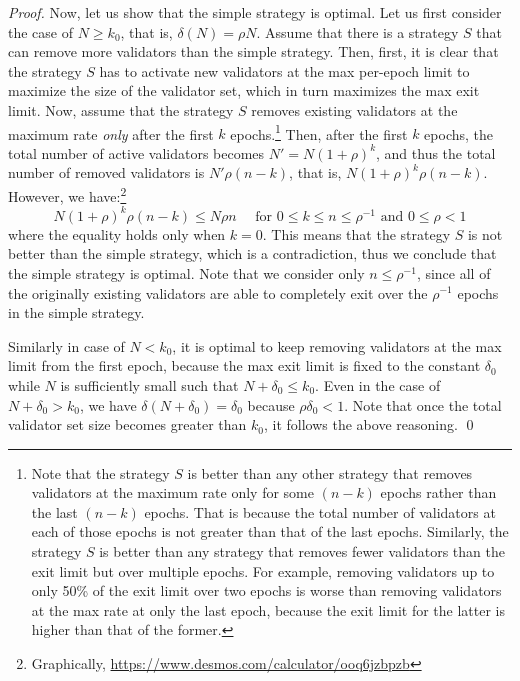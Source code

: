 \begin{proof}
Now, let us show that the simple strategy is optimal.
Let us first consider the case of $N \ge k_0$, that is, $\delta(N) = \rho N$.
Assume that there is a strategy $S$ that can remove more validators than the simple strategy.
Then, first, it is clear that the strategy $S$ has to activate new validators at the max per-epoch limit to maximize the size of the validator set, which in turn maximizes the max exit limit.
Now, assume that the strategy $S$ removes existing validators at the maximum rate \emph{only} after the first $k$ epochs.\footnote{Note that the strategy $S$ is better than any other strategy that removes validators at the maximum rate only for some $(n-k)$ epochs rather than the last $(n-k)$ epochs.  That is because the total number of validators at each of those epochs is not greater than that of the last epochs.  Similarly, the strategy $S$ is better than any strategy that removes fewer validators than the exit limit but over multiple epochs.  For example, removing validators up to only 50\% of the exit limit over two epochs is worse than removing validators at the max rate at only the last epoch, because the exit limit for the latter is higher than that of the former.}
Then, after the first $k$ epochs, the total number of active validators becomes $N' = N(1+\rho)^k$, and thus the total number of removed validators is $N'\rho(n-k)$, that is, $N(1+\rho)^k\rho(n-k)$.
However, we have:\footnote{Graphically, \url{https://www.desmos.com/calculator/ooq6jzbpzb}}
\begin{equation}\label{eq:optimal}
N(1+\rho)^k\rho(n-k) \le N\rho n \quad \textrm{ for } 0 \le k \le n \le \rho^{-1} \textrm{ and } 0 \le \rho < 1
\end{equation}
where the equality holds only when $k = 0$.
This means that the strategy $S$ is not better than the simple strategy, which is a contradiction, thus we conclude that the simple strategy is optimal.
Note that we consider only $n \le \rho^{-1}$, since all of the originally existing validators are able to completely exit over the $\rho^{-1}$ epochs in the simple strategy.

Similarly in case of $N < k_0$, it is optimal to keep removing validators at the max limit from the first epoch, because the max exit limit is fixed to the constant $\delta_0$ while $N$ is sufficiently small such that $N + \delta_0 \le k_0$.
Even in the case of $N + \delta_0 > k_0$, we have $\delta(N + \delta_0) = \delta_0$ because $\rho\delta_0 < 1$.
Note that once the total validator set size becomes greater than $k_0$, it follows the above reasoning.
\qed
\end{proof}

